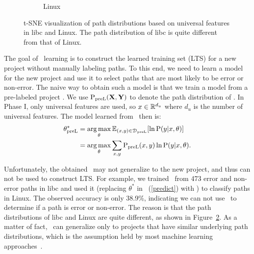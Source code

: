\documentclass[12pt]{report}	%
\begin{document}
\begin{figure}
\begin{subfigure}[b]{0.5\textwidth}
    \caption{Linux}
    \label{fig:distri3:linux}
\end{subfigure}
\caption{t-SNE visualization of path distributions based on universal features in libc and Linux.
The path distribution of libc is quite different from that of Linux.}
\label{fig:distri3}
\end{figure}

The goal of \phasef\ learning is to construct the learned training set (LTS) for a new project
without manually labeling paths.
%
To this end, we need to learn a model for the new project
and use it to select paths that are most likely to be error or non-error.
%
The naive way to obtain such a model is that
we train a model from a pre-labeled project \DS.
We use $\text{P}_\text{preL}(\mathbf{X}, \mathbf{Y})$ to denote the path distribution of \DS.
In Phase I, only universal features are used, 
so $x \in \mathbb{R}^{d_u}$ where $d_u$ is the number of universal features.
The model learned from \DS\ then is:
%
\begin{align} \label{mls}
\theta_\text{preL}^*
&= \operatorname*{arg\,max}_{\theta} \mathbb{E}_{(x, y) \in \mathcal{D}_\text{preL}}[\ln \text{P}(y | x, \theta)] \nonumber \\
&= \operatorname*{arg\,max}_{\theta} \sum_{x, y} \text{P}_\text{preL}(x, y) \ln \text{P}(y | x, \theta).
\end{align}

Unfortunately, the obtained \sm\ may not generalize to the new project,
and thus can not be used to construct LTS.
For example, we trained \sm\ from 473 error and non-error paths in libc
and used it (replacing $\theta^*$ in \eqn\ (\ref{predict}) with \sm)
to classify paths in Linux.
The observed accuracy is only 38.9\%,
indicating we can not use \sm\ to determine if a path is error or non-error.
The reason is that the path distributions of 
libc and Linux are quite different, as shown
in Figure~\ref{fig:distri3}. 
%
As a matter of fact, \sm\ can generalize only to projects 
that have similar underlying path distributions,
which is the assumption held by most machine learning approaches~\cite{murphy2012machine}.
\end{document}
